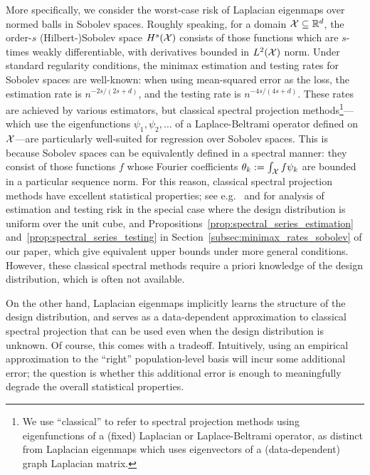 More specifically, we consider the worst-case risk of Laplacian eigenmaps over normed balls in Sobolev spaces. Roughly speaking, for a domain $\mathcal{X} \subseteq \mathbb{R}^d$, the order-$s$ (Hilbert-)Sobolev space $H^s(\mathcal{X})$ consists of those functions which are $s$-times weakly differentiable, with derivatives bounded in $L^2(\mathcal{X})$ norm. Under standard regularity conditions, the minimax estimation and testing rates for Sobolev spaces are well-known: when using mean-squared error as the loss, the estimation rate is $n^{-2s/(2s + d)}$, and the testing rate is $n^{-4s/(4s + d)}$.  These rates are achieved by various estimators, but classical spectral projection methods\footnote{We use ``classical'' to refer to spectral projection methods using eigenfunctions of a (fixed) Laplacian or Laplace-Beltrami operator, as distinct from Laplacian eigenmaps which uses eigenvectors of a (data-dependent) graph Laplacian matrix.}---which use the eigenfunctions $\psi_1,\psi_2,\ldots$ of a Laplace-Beltrami operator defined on $\mathcal{X}$---are particularly well-suited for regression over Sobolev spaces. This is because Sobolev spaces can be equivalently defined in a spectral manner: they consist of those functions $f$ whose Fourier coefficients $\theta_k := \int_{\mathcal{X}} f \psi_k$ are bounded in a particular sequence norm. For this reason, classical spectral projection methods have excellent statistical properties; see e.g.~\cite{tsybakov2008_book} and \cite{ingster2009} for analysis of estimation and testing risk in the special case where the design distribution is uniform over the unit cube, and Propositions~\ref{prop:spectral_series_estimation} and~\ref{prop:spectral_series_testing} in Section~\ref{subsec:minimax_rates_sobolev} of our paper, which give equivalent upper bounds under more general conditions. However, these classical spectral methods require a priori knowledge of the design distribution, which is often not available.

On the other hand, Laplacian eigenmaps implicitly learns the structure of the design distribution, and serves as a data-dependent approximation to classical spectral projection that can be used even when the design distribution is unknown. Of course, this comes with a tradeoff. Intuitively, using an empirical approximation to the ``right'' population-level basis will incur some additional error; the question is whether this additional error is enough to meaningfully degrade the overall statistical properties. 

